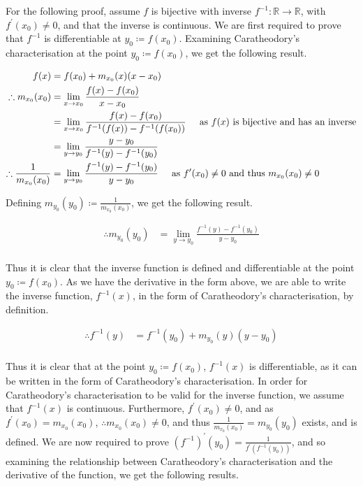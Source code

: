 \documentclass[a4paper]{article}
\begin{document}
\begin{enumerate}[label=\textbf{\arabic*.}]
\begin{enumerate}
		\bigbreak

		For the following proof, assume $f$ is bijective with inverse $\displaystyle{f^{-1}:\mathbb{R} \rightarrow \mathbb{R}}$, with $\displaystyle{f^\prime (x_0) \neq 0}$, and that the inverse is continuous. We are first required to prove that $f^{-1}$ is differentiable at $y_0 \coloneqq f(x_0)$.  Examining Caratheodory's characterisation at the point $y_0 \coloneqq f(x_0)$, we get the following result. 

		\begin{align*}
		f(x) & = f(x_0) + m_{x_0}(x)(x-x_0)\\
		\therefore m_{x_0}(x_0) & = \lim_{x \to x_0}\frac{f(x) - f(x_0)}{x-x_0}\\
		& = \lim_{x \to x_0}\frac{f(x) - f(x_0)}{f^{-1}(f(x))-f^{-1}(f(x_0))} \hspace{5mm} \text{as } f(x) \text{ is bijective and has an inverse}\\
		& = \lim_{y \to y_0}\frac{y-y_0}{f^{-1}(y) - f^{-1}(y_0)}\\
		\therefore \frac{1}{m_{x_0}(x_0)} & = \lim_{y \to y_0}\frac{f^{-1}(y) - f^{-1}(y_0)}{y-y_0} \hspace{5mm} \text{as } f^\prime (x_0) \neq 0 \text{ and thus } m_{x_0}(x_0) \neq 0\\
		\end{align*}

		Defining $\displaystyle{m_{y_0}(y_0) \coloneqq \frac{1}{m_{x_0}(x_0)}}$, we get the following result.

		\begin{align*}
		\therefore m_{y_0}(y_0) & = \lim_{y \to y_0}\frac{f^{-1}(y) - f^{-1}(y_0)}{y-y_0}\\
		\end{align*}

		Thus it is clear that the inverse function is defined and differentiable at the point $y_0 \coloneqq f(x_0)$. As we have the derivative in the form above, we are able to write the inverse function, $f^{-1}(x)$, in the form of Caratheodory's characterisation, by definition.

		\begin{align*}
		\therefore f^{-1}(y) & = f^{-1}(y_0) + m_{y_0}(y)(y-y_0)\\
		\end{align*}

		Thus it is clear that at the point $y_0 \coloneqq f(x_0)$, $f^{-1}(x)$ is differentiable, as it can be written in the form of Caratheodory's characterisation. In order for Caratheodory's characterisation to be valid for the inverse function, we assume that $f^{-1}(x)$ is continuous. Furthermore, $\displaystyle{f^\prime (x_0) \neq 0}$, and as $\displaystyle{f^\prime(x_0) = m_{x_0}(x_0)}$, $\therefore \displaystyle{m_{x_0}(x_0) \neq 0}$, and thus $\displaystyle{\frac{1}{m_{x_0}(x_0)} = m_{y_0}(y_0)}$ exists, and is defined. We are now required to prove $\displaystyle{(f^{-1})^\prime(y_0) = \frac{1}{f^\prime(f^{-1}(y_0))}}$, and so examining the relationship between Caratheodory's characterisation and the derivative of the function, we get the following results.


\end{enumerate}
\end{enumerate}
\end{document}
